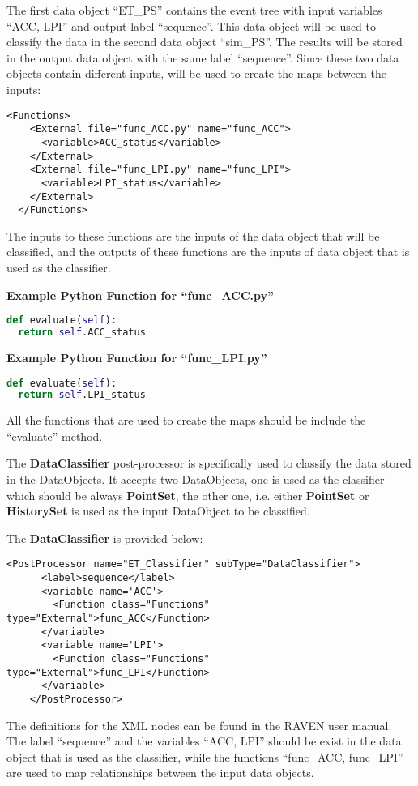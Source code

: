 The first data object ``ET\_PS'' contains the event tree with input variables ``ACC, LPI'' and output label ``sequence''.
This data object will be used to classify the data in the second data object ``sim\_PS''. The results will be stored in
the output data object with the same label ``sequence''. Since these two data objects contain different inputs,
 will be used to create the maps between the inputs:
\begin{lstlisting}[style=XML]
  <Functions>
    <External file="func_ACC.py" name="func_ACC">
      <variable>ACC_status</variable>
    </External>
    <External file="func_LPI.py" name="func_LPI">
      <variable>LPI_status</variable>
    </External>
  </Functions>
\end{lstlisting}

The inputs to these functions are the inputs of the data object that will be classified, and the outputs of these functions
are the inputs of data object that is used as the classifier.

\textbf{Example Python Function for ``func\_ACC.py''}
\begin{lstlisting}[language=python]
def evaluate(self):
  return self.ACC_status
\end{lstlisting}

\textbf{Example Python Function for ``func\_LPI.py''}
\begin{lstlisting}[language=python]
def evaluate(self):
  return self.LPI_status
\end{lstlisting}

\nb All the functions that are used to create the maps should be include the ``evaluate'' method.

The \textbf{DataClassifier} post-processor is specifically used to classify the data stored in the DataObjects. It
accepts two DataObjects, one is used as the classifier which should be always \textbf{PointSet}, the other one, i.e.
either \textbf{PointSet} or \textbf{HistorySet} is used as the input DataObject to be classified.

The \textbf{DataClassifier} is provided below:
\begin{lstlisting}[style=XML]
    <PostProcessor name="ET_Classifier" subType="DataClassifier">
      <label>sequence</label>
      <variable name='ACC'>
        <Function class="Functions" type="External">func_ACC</Function>
      </variable>
      <variable name='LPI'>
        <Function class="Functions" type="External">func_LPI</Function>
      </variable>
    </PostProcessor>
\end{lstlisting}
The definitions for the XML nodes can be found in the RAVEN user manual. The label ``sequence''
and the variables ``ACC, LPI'' should be exist in the data object that is used as the classifier,
while the functions ``func\_ACC, func\_LPI'' are used to map relationships between the input data objects.

